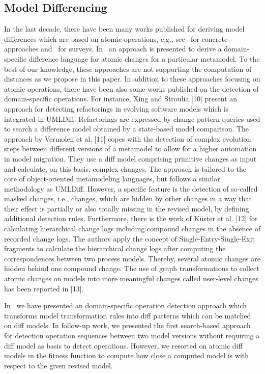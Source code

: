 \subsection{Model Differencing} In the last decade, there have been many works published for deriving model differences which are based on atomic operations, e.g., see~\cite{} for concrete approaches and~\cite{} for surveys. In~\cite{} an approach is presented to derive a domain-specific difference language for atomic changes for a particular metamodel.
 To the best of our knowledge, these approaches are not supporting the computation of distances as we propose in this paper.
In addition to these approaches focusing on atomic operations, there have been also some works published on the detection of domain-specific operations. For instance, Xing and Stroulia [10] present an approach for detecting refactorings in evolving software models which is integrated in UMLDiff. Refactorings
are expressed by change pattern queries used to search a
difference model obtained by a state-based model comparison.
The approach by Vermolen et al. [11] copes with the detection
of complex evolution steps between different versions of a
metamodel to allow for a higher automation in model
migration. They use a diff model comprising primitive changes
as input and calculate, on this basis, complex changes. The
approach is tailored to the core of object-oriented
metamodeling languages, but follows a similar methodology as
UMLDiff. However, a specific feature is the detection of so-called
masked changes, i.e., changes, which are hidden by other
changes in a way that their effect is partially or also totally
missing in the revised model, by defining additional detection
rules. Furthermore, there is the work of Küster et al. [12] for
calculating hierarchical change logs including compound
changes in the absence of recorded change logs. The authors
apply the concept of Single-Entry-Single-Exit fragments to
calculate the hierarchical change logs after computing the
correspondences between two process models. Thereby,
several atomic changes are hidden behind one compound
change. The use of graph transformations to collect atomic
changes on models into more meaningful changes called user-level
changes has been reported in [13].

In~\cite{} we have presented an domain-specific operation detection approach which transforms model transformation rules into diff patterns which can be matched on diff models. In follow-up work, we presented the first search-based approach for detection operation sequences between two model versions without requiring a diff model as basis to detect operations. However, we resorted on atomic diff models in the fitness function to compute how close a computed model is with respect to the given revised model. 

